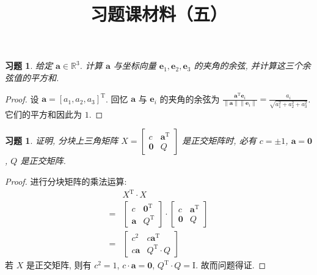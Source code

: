 \documentclass[UTF8]{ctexart}
\newtheorem{ex}[thm]{习题}
\begin{document}
\title{习题课材料（五）}
\date{}

\maketitle


\begin{ex}
  给定 \(\boldsymbol{a} \in \mathbb{R}^3\).
  计算 \(\boldsymbol{a}\) 与坐标向量 \(\boldsymbol{e}_1,\boldsymbol{e}_2,\boldsymbol{e}_3\)
  的夹角的余弦, 并计算这三个余弦值的平方和.
\end{ex}

\begin{proof}
  设 \(\boldsymbol{a}=[a_1,a_2,a_3]^{\mathrm{T}}\).
  回忆 \(\boldsymbol{a}\) 与 \(\boldsymbol{e}_i\) 的夹角的余弦为
  \(\frac{\boldsymbol{a}^{\mathrm{T}}\boldsymbol{e}_i}{\|\boldsymbol{a}\|\|\boldsymbol{e}_i\|}=\frac{a_i}{\sqrt{a_1^2+a_2^2+a_3^2}}\).
  它们的平方和因此为 \(1\).
\end{proof}

\begin{ex}
  证明, 分块上三角矩阵
  \(X=\begin{bmatrix} c & \boldsymbol{a}^{\mathrm{T}} \\ \boldsymbol{0} & Q\end{bmatrix}\)
  是正交矩阵时, 必有 \(c = \pm 1\), \(\boldsymbol{a} = \boldsymbol{0}\),
  \(Q\) 是正交矩阵.
\end{ex}

\begin{proof}
  进行分块矩阵的乘法运算:
  \begin{align*}
    & X^{\mathrm{T}} \cdot X \\
    =& \begin{bmatrix} c & \boldsymbol{0}^{\mathrm{T}} \\ \boldsymbol{a} & Q^{\mathrm{T}}\end{bmatrix} \cdot
       \begin{bmatrix} c & \boldsymbol{a}^{\mathrm{T}} \\ \boldsymbol{0} & Q\end{bmatrix}  \\
    =&
       \begin{bmatrix}
         c^2 & c\boldsymbol{a}^{\mathrm{T}} \\ c\boldsymbol{a} & Q^{\mathrm{T}} \cdot Q
       \end{bmatrix}
  \end{align*}
  若 \(X\) 是正交矩阵, 则有 \(c^2 = 1\), \(c \cdot \boldsymbol{a} = \boldsymbol{0}\),
  \(Q^{\mathrm{T}}\cdot Q = \mathrm{I}\). 故而问题得证.
\end{proof}
\end{document}
